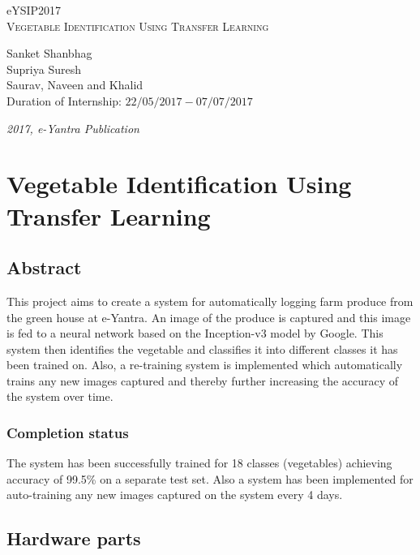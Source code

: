\documentclass[a4paper,12pt,oneside]{book}
\begin{document}
\begin{titlepage}
\raggedright
{\Large eYSIP2017\\[1cm]}
{\Huge\scshape Vegetable Identification Using Transfer Learning \\[.1in]}
\vfill
\begin{flushright}
{\large Sanket Shanbhag \\}
{\large Supriya Suresh \\}
{\large Saurav, Naveen and Khalid \\}
{\large Duration of Internship: $ 22/05/2017-07/07/2017 $ \\}
\end{flushright}

{\itshape 2017, e-Yantra Publication}
\end{titlepage}

\chapter[Project Tag]{Vegetable Identification Using \\ Transfer Learning}
\section*{Abstract}
This project aims to create a system for automatically logging farm produce from the green house at e-Yantra. An image of the produce is captured and this image is fed to a neural network based on the Inception-v3 model by Google. This system then identifies the vegetable and classifies it into different classes it has been trained on. Also, a re-training system is implemented which automatically trains any new images captured and thereby further increasing the accuracy of the system over time.

\subsection*{Completion status}
The system has been successfully trained for 18 classes (vegetables) achieving accuracy of 99.5\% on a separate test set. Also a system has been implemented for auto-training any new images captured on the system every 4 days.

\section{Hardware parts}
\newpage
\end{document}
